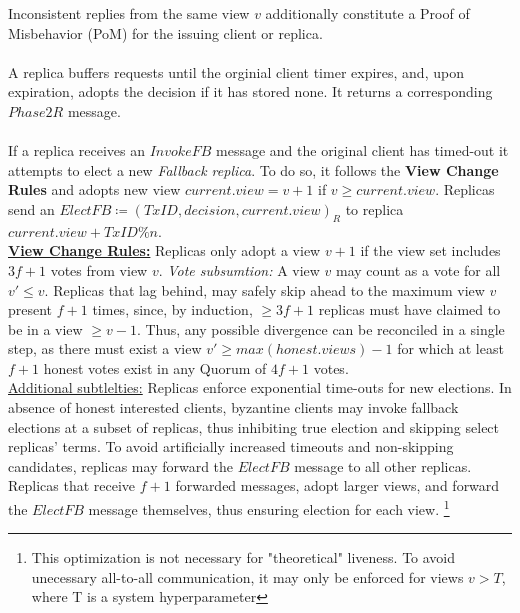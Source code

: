 Inconsistent replies from the same view $v$ additionally constitute a Proof of Misbehavior (PoM) for the issuing client or replica. \\
\\
A replica buffers requests until the orginial client timer expires, and, upon expiration, adopts the decision if it has stored none. It returns a corresponding $Phase2R$ message. \\
\\
If a replica receives an $InvokeFB$ message and the original client has timed-out it attempts to elect a new \textit{Fallback replica}. To do so, it follows the \textbf{View Change Rules} and adopts new view $current.view = v+1$ if $v \geq current.view$. 
Replicas send an $ElectFB \coloneqq (TxID, decision, current.view)_R$ to replica $current.view + TxID \% n$. \\
\underline{\textbf{View Change Rules:}} \one Replicas only adopt a view $v+1$ if the view set includes $3f+1$ votes from view $v$. \textit{Vote subsumtion:} A view $v$ may count as a vote for all $v' \leq v$. \two Replicas that lag behind, may safely skip ahead to the maximum view $v$ present $f+1$ times, since, by induction, $\geq 3f+1$ replicas must have claimed to be in a view $\geq v-1$. Thus, any possible divergence can be reconciled in a single step, as there must exist a view $v' \geq max(honest.views) -1 $ for which at least $f+1$ honest votes exist in any Quorum of $4f+1$ votes.\\
\underline{Additional subtlelties:} Replicas enforce exponential time-outs for new elections. In absence of honest interested clients, byzantine clients may invoke fallback elections at a subset of replicas, thus inhibiting true election and skipping select replicas' terms. To avoid artificially increased timeouts and non-skipping candidates, replicas may forward the $ElectFB$ message to all other replicas. Replicas that receive $f+1$ forwarded messages, adopt larger views, and forward the $ElectFB$ message themselves, thus ensuring election for each view.
\footnote{This optimization is not necessary for "theoretical" liveness. To avoid unecessary all-to-all communication, it may only be enforced for views $v > T$, where T is a system hyperparameter }\\
